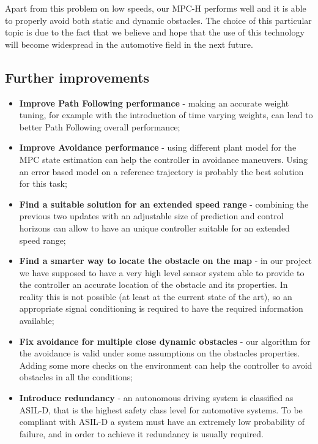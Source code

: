 Apart from this problem on low speeds, our MPC-H performs well and it is able to properly avoid both static and dynamic obstacles. 
The choice of this particular topic is due to the fact that we believe and hope that the use of this technology will become widespread in the automotive field in the next future.

\subsection{Further improvements}


\begin{itemize}
    \item \textbf{Improve Path Following performance} - making an accurate weight tuning, for example with the introduction of time varying weights, can lead to better Path Following overall performance;
    \item \textbf{Improve Avoidance performance} - using different plant model for the MPC state estimation can help the controller in avoidance maneuvers. Using an error based model on a reference trajectory is probably the best solution for this task;
    \item \textbf{Find a suitable solution for an extended speed range} - combining the previous two updates with an adjustable size of prediction and control horizons can allow to have an unique controller suitable for an extended speed range;
    \item \textbf{Find a smarter way to locate the obstacle on the map} - in our project we have supposed to have a very high level sensor system able to provide to the controller an accurate location of the obstacle and its properties. In reality this is not possible (at least at the current state of the art), so an appropriate signal conditioning is required to have the required information available;
    \item \textbf{Fix avoidance for multiple close dynamic obstacles} - our algorithm for the avoidance is valid under some assumptions on the obstacles properties. Adding some more checks on the environment can help the controller to avoid obstacles in all the conditions;
    \item \textbf{Introduce redundancy} - an autonomous driving system is classified as ASIL-D, that is the highest safety class level for automotive systems. To be compliant with ASIL-D a system must have an extremely low probability of failure, and in order to achieve it redundancy is usually  required.
\end{itemize}



